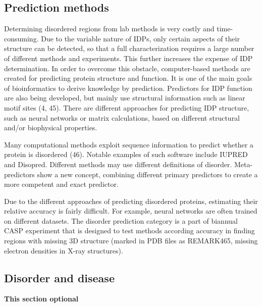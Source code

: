 \documentclass[
]{book}
\begin{document}
\hypertarget{prediction-methods}{%
\subsection{Prediction methods}\label{prediction-methods}}

Determining disordered regions from lab methods is very costly and time-consuming. Due to the variable nature of IDPs, only certain aspects of their structure can be detected, so that a full characterization requires a large number of different methods and experiments. This further increases the expense of IDP determination. In order to overcome this obstacle, computer-based methods are created for predicting protein structure and function. It is one of the main goals of bioinformatics to derive knowledge by prediction. Predictors for IDP function are also being developed, but mainly use structural information such as linear motif sites (4, 45). There are different approaches for predicting IDP structure, such as neural networks or matrix calculations, based on different structural and/or biophysical properties.

Many computational methods exploit sequence information to predict whether a protein is disordered (46). Notable examples of such software include IUPRED and Disopred. Different methods may use different definitions of disorder. Meta-predictors show a new concept, combining different primary predictors to create a more competent and exact predictor.

Due to the different approaches of predicting disordered proteins, estimating their relative accuracy is fairly difficult. For example, neural networks are often trained on different datasets. The disorder prediction category is a part of biannual CASP experiment that is designed to test methods according accuracy in finding regions with missing 3D structure (marked in PDB files as REMARK465, missing electron densities in X-ray structures).

\hypertarget{disorder-and-disease}{%
\subsection{Disorder and disease}\label{disorder-and-disease}}

\textbf{This section optional}
\end{document}
